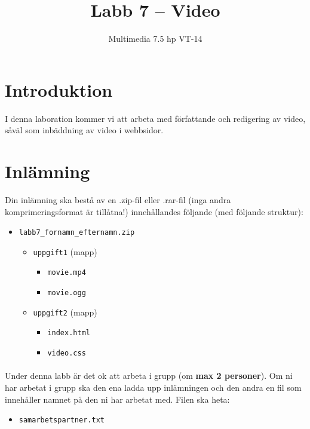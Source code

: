 \documentclass[12pt]{article}
\date{}
\title{ Labb 7 -- Video }
\author{ Multimedia 7.5 hp VT-14 }
\begin{document}
\maketitle
\vspace{-3.5em}




\section{Introduktion}
I denna laboration kommer vi att arbeta med författande och redigering av video, såväl som inbäddning av video i webbsidor.

\section{Inlämning}
Din inlämning ska bestå av en .zip-fil eller .rar-fil (inga andra komprimeringsformat är tillåtna!) innehållandes följande (med följande struktur):
  \begin{itemize}
    \item \texttt{labb7\_fornamn\_efternamn.zip}
      \vspace{-0.5em}
      \begin{itemize}
        \item \texttt{uppgift1} (mapp)
          \begin{itemize}
            \item \texttt{movie.mp4}
            \item \texttt{movie.ogg}
          \end{itemize}
        \item \texttt{uppgift2} (mapp)
          \begin{itemize}
            \item \texttt{index.html}
            \item \texttt{video.css}
          \end{itemize}
    \end{itemize}
  \end{itemize}
  \paragraph{}
  Under denna labb är det ok att arbeta i grupp (om \textbf{max 2 personer}). Om ni har arbetat i grupp ska den ena ladda upp inlämningen och den andra en fil som innehåller namnet på den ni har arbetat med. Filen ska heta:
  \begin{itemize}
    \item \texttt{samarbetspartner.txt}
  \end{itemize}
\end{document}
